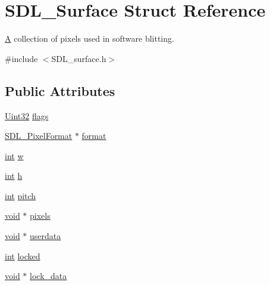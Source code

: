 \hypertarget{struct_s_d_l___surface}{}\section{S\+D\+L\+\_\+\+Surface Struct Reference}
\label{struct_s_d_l___surface}


\mbox{\hyperlink{struct_a}{A}} collection of pixels used in software blitting.  




{\ttfamily \#include $<$S\+D\+L\+\_\+surface.\+h$>$}

\subsection*{Public Attributes}
\begin{DoxyCompactItemize}
\item 
\mbox{\hyperlink{_s_d_l__stdinc_8h_add440eff171ea5f55cb00c4a9ab8672d}{Uint32}} \mbox{\hyperlink{struct_s_d_l___surface_a86d78b665d5dfd7aa1dd9696b067641b}{flags}}
\item 
\mbox{\hyperlink{struct_s_d_l___pixel_format}{S\+D\+L\+\_\+\+Pixel\+Format}} $\ast$ \mbox{\hyperlink{struct_s_d_l___surface_a0a90721f947c10c3b79e02ccb419ca62}{format}}
\item 
\mbox{\hyperlink{warnings_8h_a74f207b5aa4ba51c3a2ad59b219a423b}{int}} \mbox{\hyperlink{struct_s_d_l___surface_a9b0ec7185dcdb2a3530a9160a6ea83d9}{w}}
\item 
\mbox{\hyperlink{warnings_8h_a74f207b5aa4ba51c3a2ad59b219a423b}{int}} \mbox{\hyperlink{struct_s_d_l___surface_af33bcf87a1f5e10a99b3c7e8626b38c8}{h}}
\item 
\mbox{\hyperlink{warnings_8h_a74f207b5aa4ba51c3a2ad59b219a423b}{int}} \mbox{\hyperlink{struct_s_d_l___surface_a5fa37325d77d65b2ed64ffc7cd01bb6c}{pitch}}
\item 
\mbox{\hyperlink{_s_d_l__opengles2__gl2ext_8h_ae5d8fa23ad07c48bb609509eae494c95}{void}} $\ast$ \mbox{\hyperlink{struct_s_d_l___surface_abd9597e0e084b8ef33fe0397bc26d911}{pixels}}
\item 
\mbox{\hyperlink{_s_d_l__opengles2__gl2ext_8h_ae5d8fa23ad07c48bb609509eae494c95}{void}} $\ast$ \mbox{\hyperlink{struct_s_d_l___surface_ae66d973dcb9b57cb34815892e1ee1f31}{userdata}}
\item 
\mbox{\hyperlink{warnings_8h_a74f207b5aa4ba51c3a2ad59b219a423b}{int}} \mbox{\hyperlink{struct_s_d_l___surface_a5022edaeea1c0a055fa5d6dccba41de2}{locked}}
\item 
\mbox{\hyperlink{_s_d_l__opengles2__gl2ext_8h_ae5d8fa23ad07c48bb609509eae494c95}{void}} $\ast$ \mbox{\hyperlink{struct_s_d_l___surface_a0afacfb933b54a9af0846a307a6924fb}{lock\+\_\+data}}

\end{DoxyCompactItemize}
